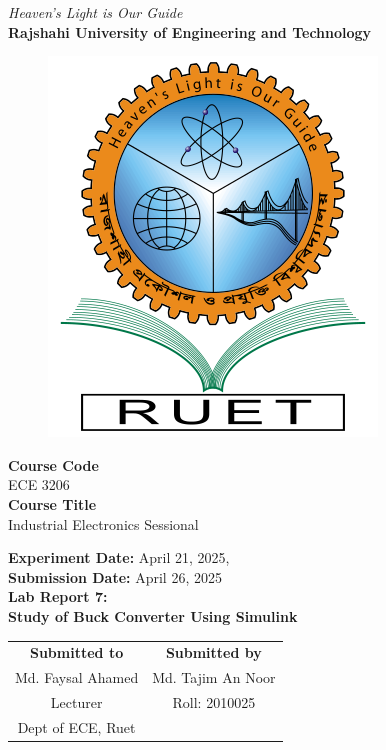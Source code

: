 \vspace*{\fill}
\begin{center}

    \emph{Heaven's Light is Our Guide} \\
    \textbf{Rajshahi University of Engineering and Technology} \\

    \begin{figure}[H]
        \centering
        \includegraphics[scale=.34]{images/RUET_logo.png}
        \label{fig:ruet_logo}
    \end{figure}
    \vspace{5mm}

    \textbf{Course Code}\\
    ECE 3206\\
    \vspace{3mm}
    \textbf{Course Title}\\
    Industrial Electronics Sessional

    \vspace{5mm}
    \textbf{Experiment Date:} {April 21, 2025},\\
    \textbf{Submission Date:} {April 26, 2025}\\

    \vspace{5mm}
    \textbf{Lab Report 7: \\
        Study of Buck Converter Using Simulink}

    \vspace{15mm}

    \begin{tabular}{c|c}
        \textbf{Submitted to} & \textbf{Submitted by} \\
        Md. Faysal Ahamed     & Md. Tajim An Noor     \\
        Lecturer              & Roll: 2010025         \\
        Dept of ECE, Ruet     &                       \\
    \end{tabular}

\end{center}
\vspace*{\fill}
